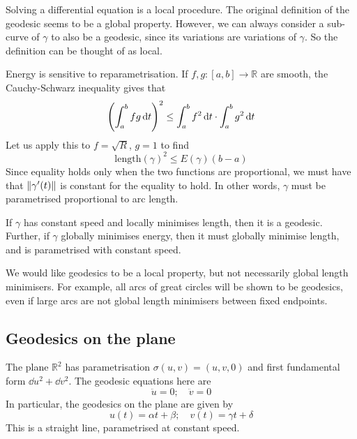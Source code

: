 \begin{remark}
	Solving a differential equation is a local procedure.
	The original definition of the geodesic seems to be a global property.
	However, we can always consider a sub-curve of \( \gamma \) to also be a geodesic, since its variations are variations of \( \gamma \).
	So the definition can be thought of as local.

	Energy is sensitive to reparametrisation.
	If \( f, g \colon [a,b] \to \mathbb R \) are smooth, the Cauchy-Schwarz inequality gives that
	\[ \qty(\int_a^b fg \dd{t})^2 \leq \int_a^b f^2 \dd{t} \cdot \int_a^b g^2 \dd{t} \]
	Let us apply this to \( f = \sqrt{R} \), \( g = 1 \) to find
	\[ \mathrm{length}(\gamma)^2 \leq E(\gamma)(b-a) \]
	Since equality holds only when the two functions are proportional, we must have that \( \norm{\gamma'(t)} \) is constant for the equality to hold.
	In other words, \( \gamma \) must be parametrised proportional to arc length.
\end{remark}
\begin{corollary}
	If \( \gamma \) has constant speed and locally minimises length, then it is a geodesic.
	Further, if \( \gamma \) globally minimises energy, then it must globally minimise length, and is parametrised with constant speed.
\end{corollary}
\begin{remark}
	We would like geodesics to be a local property, but not necessarily global length minimisers.
	For example, all arcs of great circles will be shown to be geodesics, even if large arcs are not global length minimisers between fixed endpoints.
\end{remark}

\subsection{Geodesics on the plane}
The plane \( \mathbb R^2 \) has parametrisation \( \sigma(u,v) = (u,v,0) \) and first fundamental form \( \dd{u}^2 + \dd{v}^2 \).
The geodesic equations here are
\[ \ddot u = 0;\quad \ddot v = 0 \]
In particular, the geodesics on the plane are given by
\[ u(t) = \alpha t + \beta;\quad v(t) = \gamma t + \delta \]
This is a straight line, parametrised at constant speed.

